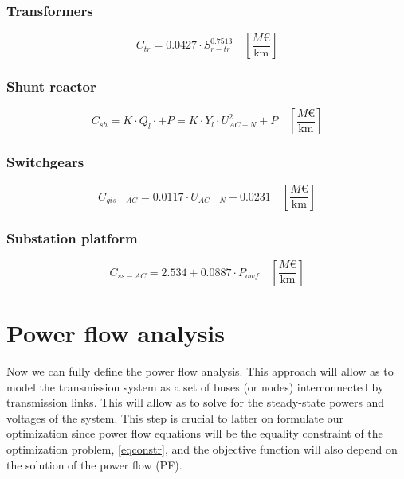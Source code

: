 \documentclass[a4paper,11pt, titlepage, twoside]{article}
\begin{document}
\subsubsection{Transformers}

\begin{equation}
    C_{tr}= 0.0427 \cdot S_{r-tr}^{0.7513} \quad \left[\frac{M\euro}{\text{km}}\right]
\end{equation}

\subsubsection{Shunt reactor}

\begin{equation}
    C_{sh}= K \cdot Q_l \cdot + P = K \cdot Y_l\cdot U_{AC-N}^2 + P \quad \left[\frac{M\euro}{\text{km}}\right]
\end{equation}

\subsubsection{Switchgears}

\begin{equation}
    C_{gis-AC} = 0.0117 \cdot U_{AC-N} + 0.0231 \quad \left[\frac{M\euro}{\text{km}}\right]
\end{equation}

\subsubsection{Substation platform}

\begin{equation}
    C_{ss-AC} = 2.534 + 0.0887 \cdot P_{owf} \quad \left[\frac{M\euro}{\text{km}}\right]
\end{equation}

\newpage

\section{Power flow analysis} \label{fulltransmission}

Now we can fully define the power flow analysis.  This approach will allow as to model the transmission system as a set of buses (or nodes)
interconnected by transmission links. This will allow as to solve for the steady-state powers and voltages of the system. This step is crucial to latter on
formulate our optimization since power flow equations will be the equality constraint of the optimization problem, \ref{eqconstr}, and the objective function will also depend on the solution of the power flow (PF).
\end{document}
